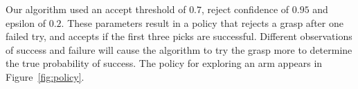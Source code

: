 \documentclass{article}
\newcommand{\algorithmCTxt}{Ordered Confidence Bound\xspace}
\begin{document}
Our algorithm used an accept threshold of $0.7$, reject confidence of
$0.95$ and epsilon of $0.2$.  These parameters result in a policy that
rejects a grasp after one failed try, and accepts if the first three
picks are successful.  Different observations of success and failure
will cause the algorithm to try the grasp more to determine the true
probability of success.  The policy for exploring an arm appears in
Figure~\ref{fig:policy}.

\end{document}
